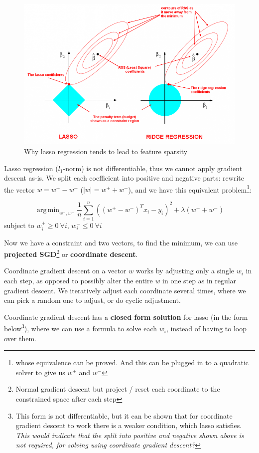 \documentclass{article}
\DeclareMathOperator*{\argmin}{arg\,min}
\begin{document}
\begin{figure}[h]
\centering
\includegraphics[scale=0.3]{res/lasso_vs_ridge_regression.png}
\caption{Why lasso regression tends to lead to feature sparsity}
\label{lasso-vs-ridge-sparsity}
\end{figure}

Lasso regression ($\mathit{l}_1$-norm) is not differentiable, thus we cannot apply gradient descent as-is.
We split each coefficient into positive and negative parts: rewrite the vector $w = w^{+} - w^{-}$ ($|w| = w^{+} + w^{-}$), and we have this equivalent problem\footnote{whose equivalence can be proved. And this can be plugged in to a quadratic solver to give us $w^{+}$ and $w^{-}$}:

$$
\argmin_{w^{+}, w^{-}}{\frac{1}{n} \sum_{i = 1}^{n}{((w^{+} - w^{-})^{T} x_i - y_i)^2} + \lambda (w^{+} + w^{-})}
$$
subject to $w_i^{+} \geq 0 ~ \forall i$, $w_i^{-} \leq 0 ~ \forall i$

Now we have a constraint and two vectors, to find the minimum, we can use \textbf{projected SGD}\footnote{Normal gradient descent but project / reset each coordinate to the constrained space after each step} or \textbf{coordinate descent}.

Coordinate gradient descent on a vector $w$ works by adjusting only a single $w_i$ in each step, as opposed to possibly alter the entire $w$ in one step as in regular gradient descent.
We iteratively adjust each coordinate several times, where we can pick a random one to adjust, or do cyclic adjustment.

Coordinate gradient descent has a \textbf{closed form solution} for lasso (in the form below\footnote{This form is not differentiable, but it can be shown that for coordinate gradient descent to work there is a weaker condition, which lasso satisfies. \textit{This would indicate that the split into positive and negative shown above is not required, for solving using coordinate gradient descent?}}), where we can use a formula to solve each $w_i$, instead of having to loop over them.
\end{document}

